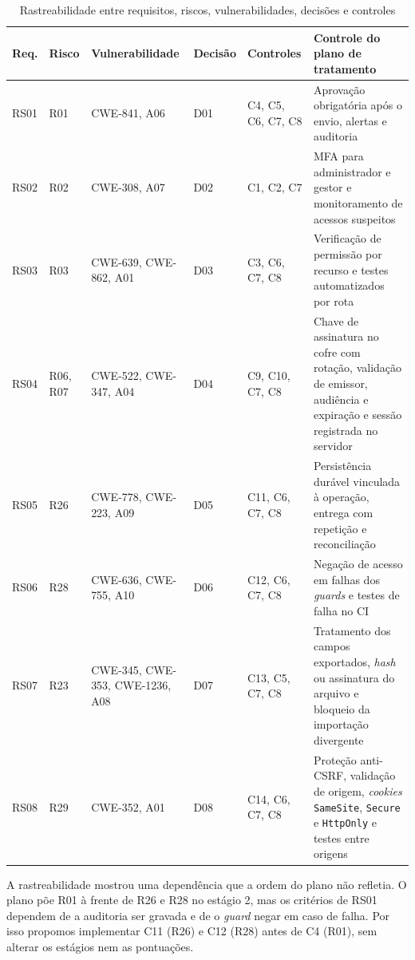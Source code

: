 \documentclass[conference]{IEEEtran}
\begin{document}
\begin{table}[!t]
\centering
\caption{Rastreabilidade entre requisitos, riscos, vulnerabilidades, decisões e controles}
\label{tab:rastreabilidade}
\footnotesize
\renewcommand{\arraystretch}{1.15}
\begin{tabularx}{\textwidth}{@{}l l >{\raggedright\arraybackslash}p{2.9cm} l >{\raggedright\arraybackslash}p{1.6cm} Y@{}}
\hline
\textbf{Req.} & \textbf{Risco} & \textbf{Vulnerabilidade} & \textbf{Decisão} & \textbf{Controles} & \textbf{Controle do plano de tratamento} \\
\hline
RS01 & R01 & CWE-841, A06 & D01 & C4, C5, C6, C7, C8 & Aprovação obrigatória após o envio, alertas e auditoria \\
RS02 & R02 & CWE-308, A07 & D02 & C1, C2, C7 & MFA para administrador e gestor e monitoramento de acessos suspeitos \\
RS03 & R03 & CWE-639, CWE-862, A01 & D03 & C3, C6, C7, C8 & Verificação de permissão por recurso e testes automatizados por rota \\
RS04 & R06, R07 & CWE-522, CWE-347, A04 & D04 & C9, C10, C7, C8 & Chave de assinatura no cofre com rotação, validação de emissor, audiência e expiração e sessão registrada no servidor \\
RS05 & R26 & CWE-778, CWE-223, A09 & D05 & C11, C6, C7, C8 & Persistência durável vinculada à operação, entrega com repetição e reconciliação \\
RS06 & R28 & CWE-636, CWE-755, A10 & D06 & C12, C6, C7, C8 & Negação de acesso em falhas dos \textit{guards} e testes de falha no CI \\
RS07 & R23 & CWE-345, CWE-353, CWE-1236, A08 & D07 & C13, C5, C7, C8 & Tratamento dos campos exportados, \textit{hash} ou assinatura do arquivo e bloqueio da importação divergente \\
RS08 & R29 & CWE-352, A01 & D08 & C14, C6, C7, C8 & Proteção anti-CSRF, validação de origem, \textit{cookies} \texttt{SameSite}, \texttt{Secure} e \texttt{HttpOnly} e testes entre origens \\
\hline
\end{tabularx}
\end{table}

A rastreabilidade mostrou uma dependência que a ordem do plano não refletia. O plano põe R01 à frente de R26 e R28 no estágio 2, mas os critérios de RS01 dependem de a auditoria ser gravada e de o \textit{guard} negar em caso de falha. Por isso propomos implementar C11 (R26) e C12 (R28) antes de C4 (R01), sem alterar os estágios nem as pontuações.
\end{document}
